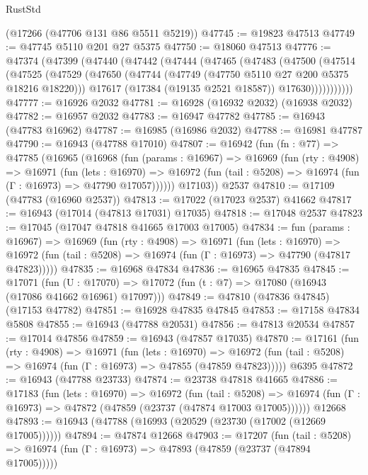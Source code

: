 \begin{lexlean}{RustStd}
\begin{coremodule}
    (@17266 (@47706 @131 @86 @5511 @5219))
@47745 := @19823 @47513
@47749 := @47745 @5110 @201 @27 @5375
@47750 := @18060 @47513
@47776 := @47374
    (@47399
      (@47440
        (@47442
          (@47444
            (@47465
              (@47483
                (@47500
                  (@47514
                    (@47525
                      (@47529
                        (@47650
                          (@47744 (@47749 (@47750 @5110 @27 @200 @5375 @18216 @18220)))
                          @17617
                          (@17384 (@19135 @2521 @18587))
                          @17630)))))))))))
@47777 := @16926 @2032
@47781 := @16928 (@16932 @2032) (@16938 @2032)
@47782 := @16957 @2032
@47783 := @16947 @47782
@47785 := @16943 (@47783 @16962)
@47787 := @16985 (@16986 @2032)
@47788 := @16981 @47787
@47790 := @16943 (@47788 @17010)
@47807 := @16942
    (fun (fn : @77) =>
    @47785
      (@16965
        (@16968
          (fun (params : @16967) =>
          @16969
            (fun (rty : @4908) =>
            @16971
              (fun (lets : @16970) =>
              @16972 (fun (tail : @5208) => @16974 (fun (Γ : @16973) => @47790 @17057))))))
        @17103))
    @2537
@47810 := @17109 (@47783 (@16960 @2537))
@47813 := @17022 (@17023 @2537) @41662
@47817 := @16943 (@17014 (@47813 @17031) @17035)
@47818 := @17048 @2537
@47823 := @17045 (@17047 @47818 @41665 @17003 @17005)
@47834 := fun (params : @16967) =>
  @16969
    (fun (rty : @4908) =>
    @16971
      (fun (lets : @16970) =>
      @16972 (fun (tail : @5208) => @16974 (fun (Γ : @16973) => @47790 (@47817 @47823)))))
@47835 := @16968 @47834
@47836 := @16965 @47835
@47845 := @17071
    (fun (U : @17070) => @17072 (fun (t : @7) => @17080 (@16943 (@17086 @41662 @16961) @17097)))
@47849 := @47810 (@47836 @47845) (@17153 @47782)
@47851 := @16928 @47835 @47845
@47853 := @17158 @47834 @5808
@47855 := @16943 (@47788 @20531)
@47856 := @47813 @20534
@47857 := @17014 @47856
@47859 := @16943 (@47857 @17035)
@47870 := @17161
    (fun (rty : @4908) =>
    @16971
      (fun (lets : @16970) =>
      @16972 (fun (tail : @5208) => @16974 (fun (Γ : @16973) => @47855 (@47859 @47823)))))
    @6395
@47872 := @16943 (@47788 @23733)
@47874 := @23738 @47818 @41665
@47886 := @17183
    (fun (lets : @16970) =>
    @16972
      (fun (tail : @5208) =>
      @16974 (fun (Γ : @16973) => @47872 (@47859 (@23737 (@47874 @17003 @17005))))))
    @12668
@47893 := @16943 (@47788 (@16993 (@20529 (@23730 (@17002 (@12669 @17005))))))
@47894 := @47874 @12668
@47903 := @17207
    (fun (tail : @5208) => @16974 (fun (Γ : @16973) => @47893 (@47859 (@23737 (@47894 @17005)))))

\end{coremodule}
\end{lexlean}
